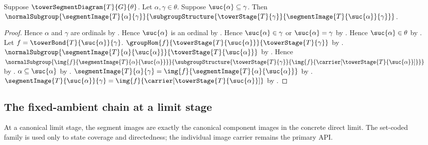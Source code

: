 \begin{theorem}\label{segment_image_successor_normal_in_later_image}
    Suppose $\towerSegmentDiagram{T}{G}{\theta}$.
    Let $\alpha,\gamma\in\theta$.
    Suppose $\suc{\alpha}\subseteq\gamma$.
    Then $\normalSubgroup
        {\segmentImage{T}{\alpha}{\gamma}}
        {\subgroupStructure
            {\towerStage{T}{\gamma}}
            {\segmentImage{T}{\suc{\alpha}}{\gamma}}}$.
\end{theorem}
\begin{proof}
    Hence $\alpha$ and $\gamma$ are ordinals by
        .
    Hence $\suc{\alpha}$ is an ordinal by .
    Hence $\suc{\alpha}\in\gamma$ or $\suc{\alpha}=\gamma$ by
        .
    Hence $\suc{\alpha}\in\theta$ by
        .
    Let $f=\towerBond{T}{\suc{\alpha}}{\gamma}$.
    $\groupHom
        {f}
        {\towerStage{T}{\suc{\alpha}}}
        {\towerStage{T}{\gamma}}$ by
        .
    $\normalSubgroup
        {\segmentImage{T}{\alpha}{\suc{\alpha}}}
        {\towerStage{T}{\suc{\alpha}}}$ by
        .
    Hence $\normalSubgroup
        {\img{f}{\segmentImage{T}{\alpha}{\suc{\alpha}}}}
        {\subgroupStructure
            {\towerStage{T}{\gamma}}
            {\img{f}{\carrier[
                \towerStage{T}{\suc{\alpha}}]}}}$ by
        .
    $\alpha\subseteq\suc{\alpha}$ by
        .
    $\segmentImage{T}{\alpha}{\gamma}=
        \img{f}{\segmentImage{T}{\alpha}{\suc{\alpha}}}$ by
        .
    $\segmentImage{T}{\suc{\alpha}}{\gamma}=
        \img{f}{\carrier[
            \towerStage{T}{\suc{\alpha}}]}$ by
        .
\end{proof}

\subsection{The fixed-ambient chain at a limit stage}

At a canonical limit stage, the segment images are exactly the canonical
component images in the concrete direct limit.  The set-coded family is used
only to state coverage and directedness; the individual image carrier remains
the primary API.

